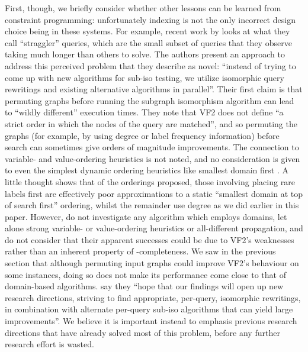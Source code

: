 \documentclass[twoside,11pt]{article}
\newcommand{\citet}[1]{\citeA{#1}}
\newcommand{\citep}[1]{\cite{#1}}
\begin{document}
First, though, we briefly consider whether other lessons can be learned from constraint programming:
unfortunately indexing is not the only incorrect design choice being in these systems. For example,
recent work by \citet{DBLP:conf/edbt/KatsarouNT17} looks at what they call ``straggler'' queries,
which are the small subset of queries that they observe taking much longer than others to solve. The
authors present an approach to address this perceived problem that they describe as novel: ``instead
of trying to come up with new algorithms for sub-iso testing, we utilize isomorphic query rewritings
and existing alternative algorithms in parallel''. Their first claim is that permuting graphs before
running the subgraph isomorphism algorithm can lead to ``wildly different'' execution times. They
note that VF2 does not define ``a strict order in which the nodes of the query are matched'', and so
permuting the graphs (for example, by using degree or label frequency information) before search can
sometimes give orders of magnitude improvements. The connection to variable- and value-ordering
heuristics is not noted, and no consideration is given to even the simplest dynamic ordering
heuristics like smallest domain first \citep{DBLP:journals/ai/HaralickE80}. A little thought shows
that of the orderings proposed, those involving placing rare labels first are effectively poor
approximations to a static ``smallest domain at top of search first'' ordering, whilst the remainder
use degree as we did earlier in this paper. However, \citeauthor{DBLP:conf/edbt/KatsarouNT17} do
not investigate any algorithm which employs domains, let alone strong variable- or value-ordering
heuristics or all-different propagation, and do not consider that their apparent successes could be
due to VF2's weaknesses rather than an inherent property of \NP-completeness. We saw in the previous
section that although permuting input graphs could improve VF2's behaviour on some instances, doing
so does not make its performance come close to that of domain-based algorithms.
\citeauthor{DBLP:conf/edbt/KatsarouNT17} say they ``hope that our findings will open up new research
directions, striving to find appropriate, per-query, isomorphic rewritings, in combination with
alternate per-query sub-iso algorithms that can yield large improvements''. We believe it is
important instead to emphasis previous research directions that have already solved most of this
problem, before any further research effort is wasted.
\end{document}

